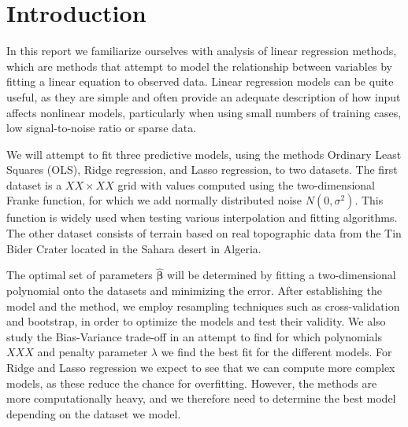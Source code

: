 \documentclass[reprint,english,notitlepage]{revtex4-1}  %
\begin{document}


\tableofcontents

\section{Introduction} 



In this report we familiarize ourselves with analysis of linear regression methods, which are methods that attempt to model the relationship between variables by fitting a linear equation to observed data. Linear regression models can be quite useful, as they are simple and often provide an adequate description of how input affects nonlinear models, particularly when using small numbers of training cases, low signal-to-noise ratio or sparse data. 

We will attempt to fit three predictive models, using the methods Ordinary Least Squares (OLS), Ridge regression, and Lasso regression, to two datasets. The first dataset is a $XX \times XX$ grid with values computed using the two-dimensional Franke function, for which we add normally distributed noise $N(0,\sigma^2)$. This function is  widely used when testing various interpolation and fitting algorithms. The other dataset consists of terrain based on real topographic data from the Tin Bider Crater located in the Sahara desert in Algeria. 

The optimal set of parameters $\boldsymbol{\hat{\beta}}$ will be determined by fitting a two-dimensional polynomial onto the datasets and minimizing the error. 
After establishing the model and the method, we employ resampling techniques such as cross-validation and bootstrap, in order to optimize the models and test their validity. We also study the Bias-Variance trade-off in an attempt to find for which polynomials $XXX$ and penalty parameter $\lambda$ we find the best fit for the different models. For Ridge and Lasso regression we expect to see that we can compute more complex models, as these reduce the chance for overfitting. However, the methods are more computationally heavy, and we therefore need to determine the best model depending on the dataset we model. 
\end{document}
